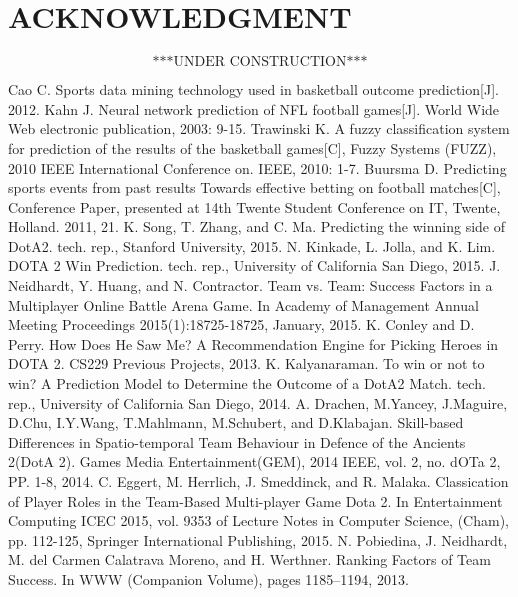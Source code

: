 \documentclass[letterpaper, 10 pt, conference]{ieeeconf}  %
\begin{document}
\section*{ACKNOWLEDGMENT}

$$\text{***UNDER CONSTRUCTION***}$$







\begin{thebibliography}{99}
 Cao C. Sports data mining technology used in basketball outcome prediction[J]. 2012.
 Kahn J. Neural network prediction of NFL football games[J]. World Wide Web electronic publication, 2003: 9-15.
 Trawinski K. A fuzzy classification system for prediction of the results of the basketball games[C], Fuzzy Systems (FUZZ), 2010 IEEE International Conference on. IEEE, 2010: 1-7.
 Buursma D. Predicting sports events from past results Towards effective betting on football matches[C], Conference Paper, presented at 14th Twente Student Conference on IT, Twente, Holland. 2011, 21.
 K. Song, T. Zhang, and C. Ma. Predicting the winning side of DotA2. tech. rep., Stanford University, 2015.
 N. Kinkade, L. Jolla, and K. Lim. DOTA 2 Win Prediction. tech. rep., University of California San Diego, 2015.
 J. Neidhardt, Y. Huang, and N. Contractor. Team vs. Team: Success Factors in a Multiplayer Online Battle Arena Game. In Academy of Management Annual Meeting Proceedings 2015(1):18725-18725, January, 2015.
 K. Conley and D. Perry. How Does He Saw Me? A Recommendation Engine for Picking Heroes in DOTA 2. CS229 Previous Projects, 2013.
 K. Kalyanaraman. To win or not to win? A Prediction Model to Determine the Outcome of a DotA2 Match. tech. rep., University of California San Diego, 2014.
 A. Drachen, M.Yancey, J.Maguire, D.Chu, I.Y.Wang, T.Mahlmann, M.Schubert, and D.Klabajan. Skill-based Differences in Spatio-temporal Team Behaviour in Defence of the Ancients 2(DotA 2). Games Media Entertainment(GEM), 2014 IEEE, vol. 2, no. dOTa 2, PP. 1-8, 2014.
 C. Eggert, M. Herrlich, J. Smeddinck, and R. Malaka. Classication of Player Roles in the Team-Based Multi-player Game Dota 2. In Entertainment Computing ICEC 2015, vol. 9353 of Lecture Notes in Computer Science, (Cham), pp. 112-125, Springer International Publishing, 2015.
 N. Pobiedina, J. Neidhardt, M. del Carmen Calatrava Moreno, and H. Werthner. Ranking Factors of Team Success. In WWW (Companion Volume), pages 1185–1194, 2013.

\end{thebibliography}
\end{document}
